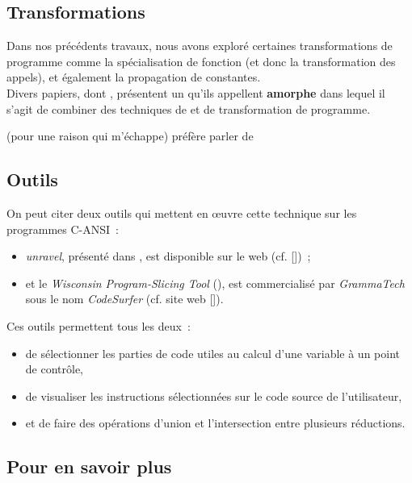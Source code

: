\subsection{Transformations}

Dans nos précédents travaux, nous avons exploré certaines transformations
de programme comme la spécialisation de fonction
(et donc la transformation des appels),
et également la propagation de constantes.\\

Divers papiers, dont \cite{harman01gustt},
présentent un \slicing qu'ils appellent {\bf amorphe}
dans lequel il s'agit de
combiner des techniques de \slicing et de transformation de programme.

 \cite{ward2002} (pour une raison qui m'échappe)
préfère parler de  \\



\subsection{Outils}

On peut citer deux outils qui mettent en {\oe}uvre cette technique sur les
programmes C-ANSI~:
\begin{itemize}
\item {\it unravel}, présenté dans \cite{lyle97using},
  est disponible sur le web  (cf. [\cite{unravel}])~;
\item et le {\it Wisconsin Program-Slicing Tool} (\cite{reps93wisconsin}),
est commercialisé par {\it GrammaTech} sous le nom {\it CodeSurfer}
(cf. site web [\cite{CodeSurfeur}]).\\
\end{itemize}

Ces outils permettent tous les deux~:
\begin{itemize}
\item de sélectionner les parties de code utiles au calcul
d'une variable à un point de contrôle,
\item de visualiser les instructions sélectionnées sur le
code source de l'utilisateur,
\item et de faire des opérations d'union et l'intersection entre plusieurs
réductions.
\end{itemize}

\subsection{Pour en savoir plus}


